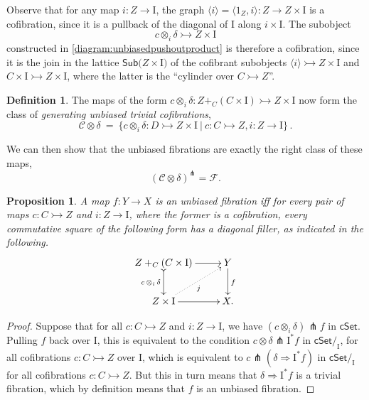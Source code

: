 \documentclass[11pt,reqno]{amsart}
\newcommand{\cSet}{\ensuremath{\mathsf{cSet}}}
\newcommand{\mono}{\ensuremath{\rightarrowtail}}
\newcommand{\ra}{\ensuremath{\rightarrow}}
\renewcommand{\to}{\ensuremath{\rightarrow}}
\newcommand{\gph}[1]{\ensuremath{\langle #1 \rangle}}
\newcommand{\Sub}[1]{\ensuremath{\mathsf{Sub}{#1}}}
\newcommand{\I}{\ensuremath{\mathrm{I}}}
\newtheorem{proposition}[theorem]{Proposition}
\theoremstyle{remark}
\theoremstyle{definition}
\newtheorem{definition}[theorem]{Definition}
\begin{document}
Observe that for any map $i : Z\to \I$, the graph $\gph{i} = \langle 1_Z, i \rangle : Z \to Z\times \I$ is a cofibration, since it is a pullback of the diagonal of $\I$ along $i\times \I$.  The subobject 
\[
c \otimes_i\!\delta \mono Z\times \I
\]
 constructed in \eqref{diagram:unbiasedpushoutproduct} is therefore a cofibration, since it is the join in the lattice $\Sub(Z\times \I)$ of the cofibrant subobjects $\gph{i} \mono Z\times \I$ and $C\times \I \mono Z\times \I$, where the latter is the ``cylinder over $C\mono Z$''.

\begin{definition}\label{def:genunbiasedtrivcof}
The maps of the form $c\otimes_i\delta : Z +_C (C\times\I) \mono Z\times\I$  now form the class of \emph{generating unbiased trivial cofibrations},
\begin{equation}\label{eq:generatingtrivialcofibrations}
\mathcal{C}\otimes\delta\ =\ \{ c \otimes_i \delta : D \mono Z \times \I\ |\ c : C\mono Z, i:Z\ra\I \}\,.
\end{equation}
\end{definition}

We can then show that the unbiased fibrations are exactly the right class of these maps,
\[
(\mathcal{C}\otimes\delta)^{\pitchfork} = \mathcal{F}.
\]
\begin{proposition}\label{prop:fibiffrlp}
A map $f: Y\ra X$ is an unbiased fibration iff for every pair of maps $c : C\mono Z$ and $i:Z\ra\I$, where the former is a cofibration, every commutative square of the following form has a diagonal filler, as indicated in the following.
\begin{equation}\label{diagram:unbiasedfibration}
\xymatrix{
Z +_C (C\times\I) \ar@{>->}[d]_{c\, \otimes_i\, \delta} \ar[r] & Y \ar[d]^f \\
Z\times \I \ar@{.>}[ru]_{j} \ar[r] & X.
}
\end{equation}
\end{proposition}

\begin{proof}
Suppose that for all $c : C\mono Z$ and $i:Z\ra\I$, we have $(c\otimes_i\delta) \pitchfork f$ in $\cSet$. Pulling $f$ back over $\I$, this is equivalent to the condition $c\otimes\delta \pitchfork \I^*f$ in $\cSet/_\I$, for all cofibrations $c : C\mono Z$ over $\I$, which is equivalent to $c\pitchfork(\delta\Rightarrow \I^*f)$ in $\cSet/_\I$ for all cofibrations $c : C\mono Z$.  But this in turn means that $\delta\Rightarrow\I^*f$ is a trivial fibration, which by definition means that $f$ is an unbiased fibration.
\end{proof}
\end{document}
